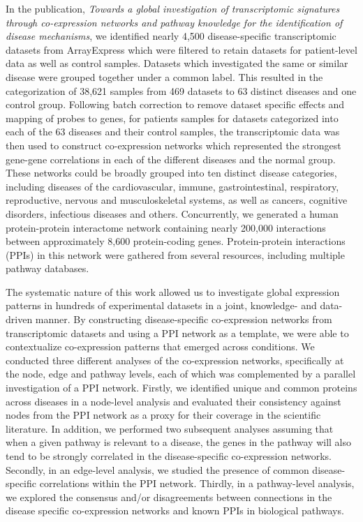 In the publication, \textit{Towards a global investigation of transcriptomic signatures through co-expression networks and pathway knowledge for the identification of disease mechanisms}, we identified nearly 4,500 disease-specific transcriptomic datasets from ArrayExpress which were filtered to retain datasets for patient-level data as well as control samples. Datasets which investigated the same or similar disease were grouped together under a common label. This resulted in the categorization of 38,621 samples from 469 datasets to 63 distinct diseases and one control group. Following batch correction to remove dataset specific effects and mapping of probes to genes, for patients samples for datasets categorized into each of the 63 diseases and their control samples, the transcriptomic data was then used to construct co-expression networks which represented the strongest gene-gene correlations in each of the different diseases and the normal group. These networks could be broadly grouped into ten distinct disease categories, including diseases of the cardiovascular, immune, gastrointestinal, respiratory, reproductive, nervous and musculoskeletal systems, as well as cancers, cognitive disorders, infectious diseases and others. Concurrently, we generated a human protein-protein interactome network containing nearly 200,000 interactions between approximately 8,600 protein-coding genes. Protein-protein interactions (PPIs) in this network were gathered from several resources, including multiple pathway databases. 

The systematic nature of this work allowed us to investigate global expression patterns in hundreds of experimental datasets in a joint, knowledge- and data- driven manner. By constructing disease-specific co-expression networks from transcriptomic datasets and using a PPI network as a template, we were able to contextualize co-expression patterns that emerged across conditions. We conducted three different analyses of the co-expression networks, specifically at the node, edge and pathway levels, each of which was complemented by a parallel investigation of a PPI network. Firstly, we identified unique and common proteins across diseases in a node-level analysis and evaluated their consistency against nodes from the PPI network as a proxy for their coverage in the scientific literature. In addition, we performed two subsequent analyses assuming that when a given pathway is relevant to a disease, the genes in the pathway will also tend to be strongly correlated in the disease-specific co-expression networks. Secondly, in an edge-level analysis, we studied the presence of common disease-specific correlations within the PPI network. Thirdly, in a pathway-level analysis, we explored the consensus and/or disagreements between connections in the disease specific co-expression networks and known PPIs in biological pathways. 

